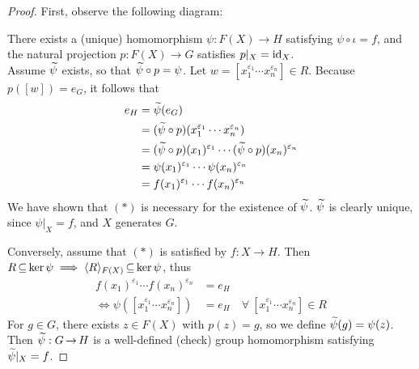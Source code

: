 \documentclass[11pt]{book}
\theoremstyle{definition}   \newtheorem{defn}[counter]{Definition} %
\newcommand{\ve}{\varepsilon}   \newcommand{\im}{\textnormal{im }}   \newcommand{\re}{\textnormal{Re }}   \newcommand{\mb}[1]{\mathbf{#1}}
\newcommand{\gen}[1]{\langle #1 \rangle}   \newcommand{\stab}[2]{\tn{Stab}_{#1}(#2)}   \newcommand{\fix}[2]{\tn{Fix}_{#1}(#2)}
\renewcommand{\arrowvert}{\arrow}   \renewcommand{\i}{\mathbf{i}}   \renewcommand{\j}{\mathbf{j}}   \renewcommand{\k}{\mathbf{k}}    \renewcommand{\H}{\mathbb{H}}
\DeclareMathOperator{\ra}{\rightarrow}   \DeclareMathOperator{\Poly}{\mathbf{P}}   \DeclareMathOperator{\spn}{\textnormal{span}}   \DeclareMathOperator{\aut}{\textnormal{Aut}}
\newcommand{\vs}{\vspace{8pt}}
\numberwithin{counter}{chapter}
\begin{document}
\begin{proof}
First, observe the following diagram:
There exists a (unique) homomorphism $\psi : F(X) \ra H$ satisfying $\psi \circ \iota = f$, and the natural projection $p : F(X) \ra G$ satisfies $p|_X = \textnormal{id}_X$. \\

 Assume $\widetilde{\psi}$ exists, so that $\widetilde{\psi} \circ p = \psi$. Let $w = [x_1^{\ve_1} \cdots x_n^{\ve_n}] \in R$. Because $p([w]) = e_G$, it follows that
	\begin{align*}
	e_H &= \wt{\psi}(e_G) \\
	&= (\wt{\psi} \circ p)(x_1^{\ve_1} \cdots x_n^{\ve_n}) \\
	&= (\wt{\psi} \circ p)(x_1)^{\ve_1} \cdots (\wt{\psi}\circ p)(x_n)^{\ve_n} \\
	&= \psi(x_1)^{\ve_1} \cdots \psi (x_n)^{\ve_n} \\
	&= f(x_1)^{\ve_1} \cdots f(x_n)^{\ve_n}
	\end{align*}
We have shown that $(\ast)$ is necessary for the existence of $\widetilde{\psi}$. $\widetilde{\psi}$ is clearly unique, since $\psi|_X = f$, and $X$ generates $G$.

Conversely, assume that $(\ast)$ is satisfied by $f : X \ra H$. Then $R \sub \ker \psi \implies \gen{R}_{F(X)} \sub \ker \psi$, thus
	\begin{align*}
	f(x_1)^{\ve_1} \cdots f(x_n)^{\ve_n} &= e_H \\
	\iff \psi([x_1^{\ve_1} \cdots x_n^{\ve_n}]) &= e_H \quad \forall \ [x_1^{\ve_1} \cdots x_n^{\ve_n}] \in R
	\end{align*}
For $g \in G$, there exists $z \in F(X)$ with $p(z) = g$, so we define $\widetilde{\psi}(g) = \psi(z)$. Then $\wt{\psi} : G \ra H$ is a well-defined (check) group homomorphism satisfying $\widetilde{\psi}|_X = f$.
\end{proof}

\vs
\end{document}
